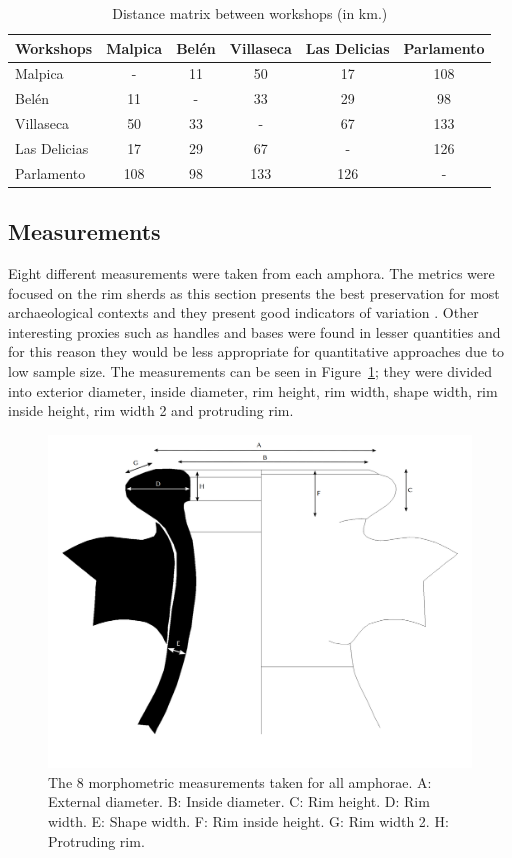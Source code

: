 \documentclass[review]{elsarticle}
\begin{document}
\begin{table}[htp]
\centering

\begin{tabular}{lccccc}
\hline

\textbf{Workshops} & Malpica & Belén & Villaseca & Las Delicias & Parlamento \\ \hline
Malpica & - & 11 & 50 & 17 & 108 \\
Belén & 11 & - & 33 & 29 & 98 \\
Villaseca & 50 & 33 & - & 67 & 133 \\
Las Delicias & 17 & 29 & 67 & - & 126 \\
Parlamento & 108 & 98 & 133 & 126 & - \\
\hline
\end{tabular}
\caption{Distance matrix between workshops (in km.)}
\label{table:distances}
\end{table}

\subsection{Measurements}

Eight different measurements were taken from each amphora. The metrics were focused on the rim sherds as this section presents the best preservation for most archaeological contexts and they present good indicators of variation \citep{berni_millet_epigrafianforica_2008}. Other interesting proxies such as handles and bases were found in lesser quantities and for this reason they would be less appropriate for quantitative approaches due to low sample size. The measurements can be seen in Figure~\ref{mesures}; they were divided into exterior diameter, inside diameter, rim height, rim width, shape width, rim inside height, rim width 2 and protruding rim.

\begin{figure}[htp]
	\centering
\includegraphics[width=\linewidth]{figs/mesures.pdf}
\caption{The 8 morphometric measurements taken for all amphorae. A: External diameter. B: Inside diameter. C: Rim height. D: Rim width. E: Shape width. F: Rim inside height. G: Rim width 2. H: Protruding rim.}
\label{mesures}
\end{figure} 
\end{document}

